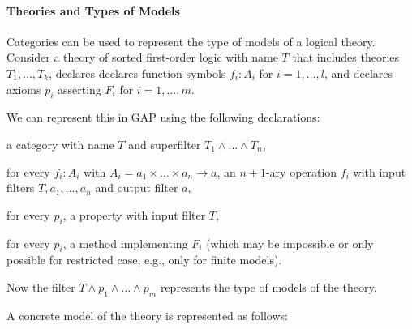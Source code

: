 
%
%
%

\paragraph{Theories and Types of Models}
Categories can be used to represent the type of models of a logical theory.
Consider a theory of sorted first-order logic with name $T$ that includes theories $T_1,\ldots,T_k$, declares declares function symbols $f_i:A_i$ for $i=1,\ldots,l$, and declares axioms $p_i$ asserting $F_i$ for $i=1,\ldots,m$.

We can represent this in GAP using the following declarations:
\begin{compactitem}
 \item a category with name $T$ and superfilter $T_1\wedge \ldots \wedge T_n$,
 \item for every $f_i:A_i$ with $A_i=a_1\times\ldots\times a_n\to a$, an $n+1$-ary operation $f_i$ with input filters $T,a_1,\ldots,a_n$ and output filter $a$,
 \item for every $p_i$, a property with input filter $T$,
 \item for every $p_i$, a method implementing $F_i$ (which may be impossible or only possible for restricted case, e.g., only for finite models).
\end{compactitem}

Now the filter $T\wedge p_1\wedge\ldots\wedge p_m$ represents the type of models of the theory.

A concrete model of the theory is represented as follows: 

%

